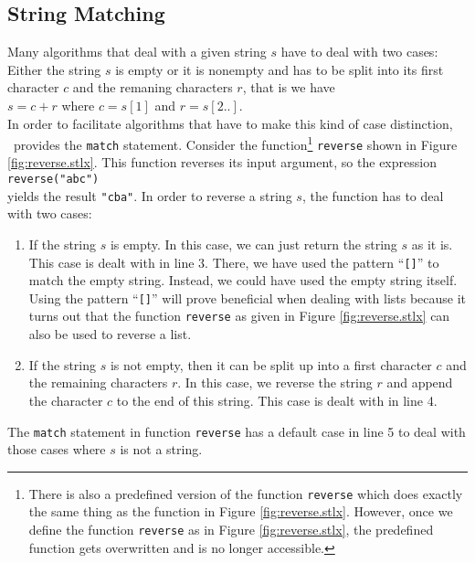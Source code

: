 \subsection{String Matching}
Many algorithms that deal with a given string $s$ have to deal with two cases:  Either the string $s$ is
empty or it is nonempty and has to be split into its first character $c$ and the remaning characters $r$,
that is we have 
\\[0.2cm]
\hspace*{1.3cm}
$s = c + r$ \quad where $c = s[1]$ and $r = s[2..]$.
\\[0.2cm]
In order to facilitate algorithms that have to make this kind of case distinction, \setlx\ provides the
\texttt{match} statement.  Consider the function\footnote{
There is also a predefined version of the function \texttt{reverse} which does exactly the
same thing as the function in Figure \ref{fig:reverse.stlx}.  However, once we define the
function \texttt{reverse} as in Figure \ref{fig:reverse.stlx}, the predefined function
gets overwritten and is no longer accessible.}
 \texttt{reverse} shown in Figure \ref{fig:reverse.stlx}.
This function reverses its input argument, so the expression
\\[0.2cm]
\hspace*{1.3cm}
\texttt{reverse("abc")}
\\[0.2cm]
yields the result \texttt{"cba"}.  In order to reverse a string $s$, the function has to deal with two
cases:
\begin{enumerate}
\item If the string $s$ is empty.  In this case, we can just return the string $s$ as it is.
      This case is dealt with in line 3.  There, we have used the pattern ``\texttt{[]}'' to match
      the empty string.  Instead, we could have used the empty string itself.  Using the pattern
      ``\texttt{[]}'' will prove beneficial when dealing with lists because it turns out that the
      function
      \texttt{reverse} as given in Figure \ref{fig:reverse.stlx} can also be used to reverse a list.
\item If the string $s$ is not empty, then it can be split up into a first character $c$ and the remaining
      characters $r$.  In this case, we reverse the string $r$ and append the character $c$ to the end of
      this string.  This case is dealt with in line 4.
\end{enumerate}
The \texttt{match} statement in function \texttt{reverse}  has a default case in line 5 to deal with
those cases where $s$ is not a string. 

